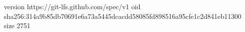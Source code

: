 version https://git-lfs.github.com/spec/v1
oid sha256:314a9b85db70691e6a73a5445dcacdd58085fd898516a95cfe1c2d841eb11300
size 2751
